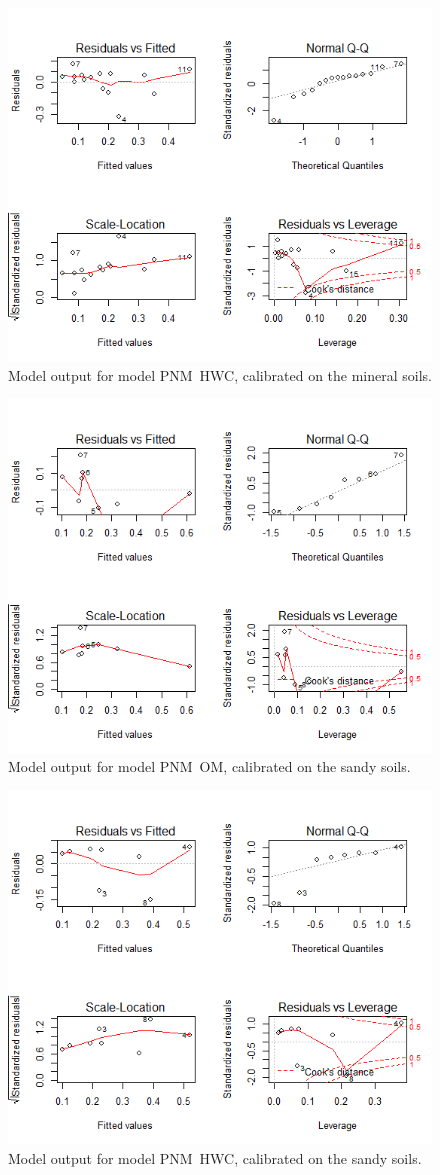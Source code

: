 \documentclass[10pt,twoside,dutch,english]{report}
\begin{document}
\begin{appendices}
\begin{figure}[H]
		\includegraphics[width=0.65\linewidth]{app_modout_minHW}
		\caption{Model output for model  PNM~HWC, calibrated on the mineral soils.}
		\end{figure}
		\begin{figure}[H] %
    	\centering
		\includegraphics[width=0.65\linewidth]{app_modout_sanOS}
		\caption{Model output for model  PNM~OM, calibrated on the sandy soils.}
		\end{figure}
		\begin{figure}[H] %
    	\centering
		\includegraphics[width=0.65\linewidth]{app_modout_sanHW}
		\caption{Model output for model  PNM~HWC, calibrated on the sandy soils.}
		\end{figure}
	

\end{appendices}
\end{document}
